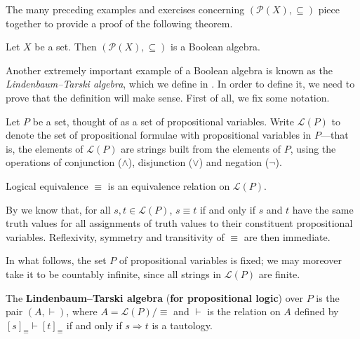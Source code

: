 The many preceding examples and exercises concerning $(\mathcal{P}(X), \subseteq)$ piece together to provide a proof of the following theorem.

\begin{theorem}
\label{thmPowerSetIsBooleanAlgebra}
Let $X$ be a set. Then $(\mathcal{P}(X), \subseteq)$ is a Boolean algebra.
\end{theorem}

Another extremely important example of a Boolean algebra is known as the \textit{Lindenbaum--Tarski algebra}, which we define in . In order to define it, we need to prove that the definition will make sense. First of all, we fix some notation.

\begin{definition}
Let $P$ be a set, thought of as a set of propositional variables. Write $\mathcal{L}(P)$ to denote the set of propositional formulae with propositional variables in $P$---that is, the elements of $\mathcal{L}(P)$ are strings built from the elements of $P$, using the operations of conjunction ($\wedge$), disjunction ($\vee$) and negation ($\neg$).
\end{definition}

\begin{lemma}
Logical equivalence $\equiv$ is an equivalence relation on $\mathcal{L}(P)$.
\end{lemma}
\begin{cproof}
By  we know that, for all $s,t \in \mathcal{L}(P)$, $s \equiv t$ if and only if $s$ and $t$ have the same truth values for all assignments of truth values to their constituent propositional variables. Reflexivity, symmetry and transitivity of $\equiv$ are then immediate.
\end{cproof}

In what follows, the set $P$ of propositional variables is fixed; we may moreover take it to be countably infinite, since all strings in $\mathcal{L}(P)$ are finite.

\begin{definition}
\label{defLindenbaumTarskiAlgebra}
The \textbf{Lindenbaum--Tarski algebra} (\textbf{for propositional logic}) over $P$ is the pair $(A, \vdash)$, where $A = \mathcal{L}(P)/{\equiv}$ and $\vdash$ is the relation on $A$ defined by $[s]_{\equiv} \vdash [t]_{\equiv}$ if and only if $s \Rightarrow t$ is a tautology.
\end{definition}

